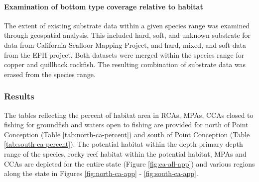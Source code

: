 \documentclass[11pt,
  english,
  a4paper,
]{article}
\begin{document}
\leavevmode\tagmcend\tagstructend\par


\hypertarget{examination-of-bottom-type-coverage-relative-to-habitat}{%
\paragraph{Examination of bottom type coverage relative to habitat}\label{examination-of-bottom-type-coverage-relative-to-habitat}}

\leavevmode\tagmcend\tagstructend


The extent of existing substrate data within a given species range was examined through geospatial analysis. This included hard, soft, and unknown substrate for data from California Seafloor Mapping Project, and hard, mixed, and soft data from the EFH project. Both datasets were merged within the species range for copper and quillback rockfish. The resulting combination of substrate data was erased from the species range.

\leavevmode\tagmcend\tagstructend\par


\hypertarget{results}{%
\subsubsection{Results}\label{results}}

\leavevmode\tagmcend\tagstructend


The tables reflecting the percent of habitat area in RCAs, MPAs, CCAs closed to fishing for groundfish and waters open to fishing are provided for north of Point Conception (Table \ref{tab:north-ca-percent}) and south of Point Conception (Table \ref{tab:south-ca-percent}). The potential habitat within the depth primary depth range of the species, rocky reef habitat within the potential habitat, MPAs and CCAs are depicted for the entire state (Figure \ref{fig:ca-all-app}) and various regions along the state in Figures \ref{fig:north-ca-app} - \ref{fig:south-ca-app}.

\leavevmode\tagmcend\tagstructend\par

\end{document}
